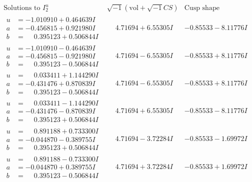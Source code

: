 \documentclass[1p]{elsarticle_modified}
\theoremstyle{definition}
\newcommand{\I}{\sqrt{-1}}
\begin{document}
$$\begin{array}{c|c|c}  
\text{Solutions to }I^u_{2}& \I (\text{vol} + \sqrt{-1}CS) & \text{Cusp shape}\\
 \hline 
\begin{aligned}
u &= -1.010910 + 0.464639 I \\
a &= -0.456815 + 0.921980 I \\
b &= \phantom{-}0.395123 + 0.506844 I\end{aligned}
 & \phantom{-}4.71694 + 6.55305 I & -0.85533 - 8.11776 I \\ \hline\begin{aligned}
u &= -1.010910 - 0.464639 I \\
a &= -0.456815 - 0.921980 I \\
b &= \phantom{-}0.395123 - 0.506844 I\end{aligned}
 & \phantom{-}4.71694 - 6.55305 I & -0.85533 + 8.11776 I \\ \hline\begin{aligned}
u &= \phantom{-}0.033411 + 1.144290 I \\
a &= -0.431476 + 0.870839 I \\
b &= \phantom{-}0.395123 - 0.506844 I\end{aligned}
 & \phantom{-}4.71694 - 6.55305 I & -0.85533 + 8.11776 I \\ \hline\begin{aligned}
u &= \phantom{-}0.033411 - 1.144290 I \\
a &= -0.431476 - 0.870839 I \\
b &= \phantom{-}0.395123 + 0.506844 I\end{aligned}
 & \phantom{-}4.71694 + 6.55305 I & -0.85533 - 8.11776 I \\ \hline\begin{aligned}
u &= \phantom{-}0.891188 + 0.733300 I \\
a &= -0.044870 - 0.389755 I \\
b &= \phantom{-}0.395123 + 0.506844 I\end{aligned}
 & \phantom{-}4.71694 - 3.72284 I & -0.85533 - 1.69972 I \\ \hline\begin{aligned}
u &= \phantom{-}0.891188 - 0.733300 I \\
a &= -0.044870 + 0.389755 I \\
b &= \phantom{-}0.395123 - 0.506844 I\end{aligned}
 & \phantom{-}4.71694 + 3.72284 I & -0.85533 + 1.69972 I \\ \hline\begin{aligned}

\end{aligned}
\end{array}$$
\end{document}
